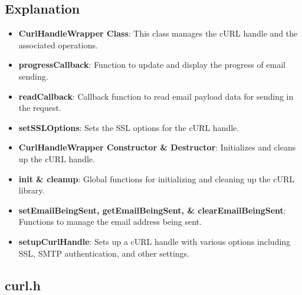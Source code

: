 \documentclass{article}
\begin{document}
	\subsection*{Explanation}
	\begin{itemize}
		\item \textbf{CurlHandleWrapper Class}: This class manages the cURL handle and the associated operations.
		\item \textbf{progressCallback}: Function to update and display the progress of email sending.
		\item \textbf{readCallback}: Callback function to read email payload data for sending in the request.
		\item \textbf{setSSLOptions}: Sets the SSL options for the cURL handle.
		\item \textbf{CurlHandleWrapper Constructor \& Destructor}: Initializes and cleans up the cURL handle.
		\item \textbf{init \& cleanup}: Global functions for initializing and cleaning up the cURL library.
		\item \textbf{setEmailBeingSent, getEmailBeingSent, \& clearEmailBeingSent}: Functions to manage the email address being sent.
		\item \textbf{setupCurlHandle}: Sets up a cURL handle with various options including SSL, SMTP authentication, and other settings.
	\end{itemize}
	
	\subsection{curl.h}
	
\end{document}

